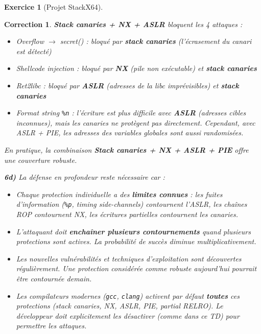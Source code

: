\documentclass[a4paper,11pt]{article}
\theoremstyle{plain}
\newtheorem{correction}{Correction}
\theoremstyle{definition}
\newtheorem{exercice}{Exercice}
\begin{document}
\begin{exercice}[Projet StackX64]
\begin{correction}
\textbf{Stack canaries + NX + ASLR} bloquent les 4 attaques :
\begin{itemize}
    \item Overflow $\to$ secret() : bloqué par \textbf{stack canaries} (l'écrasement du canari est détecté)
    \item Shellcode injection : bloqué par \textbf{NX} (pile non exécutable) et \textbf{stack canaries}
    \item Ret2libc : bloqué par \textbf{ASLR} (adresses de la libc imprévisibles) et \textbf{stack canaries}
    \item Format string \texttt{\%n} : l'écriture est plus difficile avec \textbf{ASLR} (adresses cibles inconnues), mais les canaries ne protègent pas directement. Cependant, avec ASLR + PIE, les adresses des variables globales sont aussi randomisées.
\end{itemize}

En pratique, la combinaison \textbf{Stack canaries + NX + ASLR + PIE} offre une couverture robuste.

\textbf{6d)} La défense en profondeur reste nécessaire car :
\begin{itemize}
    \item Chaque protection individuelle a des \textbf{limites connues} : les fuites d'information (\texttt{\%p}, timing side-channels) contournent l'ASLR, les chaînes ROP contournent NX, les écritures partielles contournent les canaries.
    \item L'attaquant doit \textbf{enchaîner plusieurs contournements} quand plusieurs protections sont actives. La probabilité de succès diminue multiplicativement.
    \item Les nouvelles vulnérabilités et techniques d'exploitation sont découvertes régulièrement. Une protection considérée comme robuste aujourd'hui pourrait être contournée demain.
    \item Les compilateurs modernes (\texttt{gcc}, \texttt{clang}) activent par défaut \textbf{toutes} ces protections (stack canaries, NX, ASLR, PIE, partial RELRO). Le développeur doit explicitement les désactiver (comme dans ce TD) pour permettre les attaques.
\end{itemize}


\end{correction}
\end{exercice}
\end{document}
